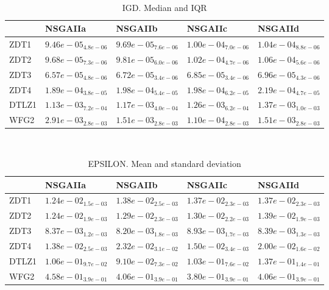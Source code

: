 \documentclass{article}
\begin{document}
\
\begin{table}
\caption{IGD. Median and IQR}
\label{table:median.IGD}
\begin{scriptsize}
\centering
\begin{tabular}{lllll}
\hline & NSGAIIa & NSGAIIb & NSGAIIc &  NSGAIId\\
\hline
ZDT1 & \cellcolor{gray95}$  9.46e-05_{ 4.8e-06}$ & \cellcolor{gray25}$  9.69e-05_{ 7.6e-06}$ & $  1.00e-04_{ 7.0e-06}$ & $  1.04e-04_{ 8.8e-06}$ \\
ZDT2 & \cellcolor{gray95}$  9.68e-05_{ 7.3e-06}$ & \cellcolor{gray25}$  9.81e-05_{ 6.0e-06}$ & $  1.02e-04_{ 4.7e-06}$ & $  1.06e-04_{ 5.6e-06}$ \\
ZDT3 & \cellcolor{gray95}$  6.57e-05_{ 4.8e-06}$ & \cellcolor{gray25}$  6.72e-05_{ 3.4e-06}$ & $  6.85e-05_{ 3.4e-06}$ & $  6.96e-05_{ 4.3e-06}$ \\
ZDT4 & \cellcolor{gray95}$  1.89e-04_{ 3.8e-05}$ & \cellcolor{gray25}$  1.98e-04_{ 5.4e-05}$ & $  1.98e-04_{ 6.2e-05}$ & $  2.19e-04_{ 4.7e-05}$ \\
DTLZ1 & \cellcolor{gray95}$  1.13e-03_{ 7.2e-04}$ & \cellcolor{gray25}$  1.17e-03_{ 4.0e-04}$ & $  1.26e-03_{ 6.2e-04}$ & $  1.37e-03_{ 1.0e-03}$ \\
WFG2 & $  2.91e-03_{ 2.8e-03}$ & \cellcolor{gray25}$  1.51e-03_{ 2.8e-03}$ & \cellcolor{gray95}$  1.10e-04_{ 2.8e-03}$ & $  1.51e-03_{ 2.8e-03}$ \\
\hline
\end{tabular}
\end{scriptsize}
\end{table}
\
\begin{table}
\caption{EPSILON. Mean and standard deviation}
\label{table:mean.EPSILON}
\centering
\begin{scriptsize}
\begin{tabular}{lllll}
\hline & NSGAIIa & NSGAIIb & NSGAIIc &  NSGAIId\\
\hline
ZDT1 & \cellcolor{gray95}$  1.24e-02_{ 1.5e-03}$ & $  1.38e-02_{ 2.5e-03}$ & $  1.37e-02_{ 2.3e-03}$ & $  1.37e-02_{ 2.3e-03}$ \\
ZDT2 & \cellcolor{gray95}$  1.24e-02_{ 1.9e-03}$ & \cellcolor{gray25}$  1.29e-02_{ 2.3e-03}$ & $  1.30e-02_{ 2.2e-03}$ & $  1.39e-02_{ 1.9e-03}$ \\
ZDT3 & \cellcolor{gray25}$  8.37e-03_{ 1.2e-03}$ & \cellcolor{gray95}$  8.20e-03_{ 1.8e-03}$ & $  8.93e-03_{ 1.7e-03}$ & $  8.39e-03_{ 1.3e-03}$ \\
ZDT4 & \cellcolor{gray95}$  1.38e-02_{ 2.5e-03}$ & $  2.32e-02_{ 3.1e-02}$ & \cellcolor{gray25}$  1.50e-02_{ 3.4e-03}$ & $  2.00e-02_{ 1.6e-02}$ \\
DTLZ1 & $  1.06e-01_{ 9.7e-02}$ & \cellcolor{gray95}$  9.10e-02_{ 7.3e-02}$ & \cellcolor{gray25}$  1.03e-01_{ 7.6e-02}$ & $  1.37e-01_{ 1.4e-01}$ \\
WFG2 & $  4.58e-01_{ 3.9e-01}$ & $  4.06e-01_{ 3.9e-01}$ & \cellcolor{gray95}$  3.80e-01_{ 3.9e-01}$ & $  4.06e-01_{ 3.9e-01}$ \\
\hline
\end{tabular}
\end{scriptsize}
\end{table}
\end{document}
